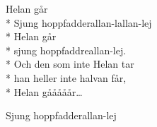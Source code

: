 \begin{SongText}
    \begin{SongVerse}
        Helan går\\*%
        Sjung hoppfadderallan-lallan-lej\\*%
        Helan går\\*%
        sjung hoppfaddreallan-lej.\\*%
        Och den som inte Helan tar\\*%
        han heller inte halvan får,\\*%
        Helan gååååår…
    \end{SongVerse}
    \begin{SongVerse}
        Sjung hoppfadderallan-lej
    \end{SongVerse}
\end{SongText}
